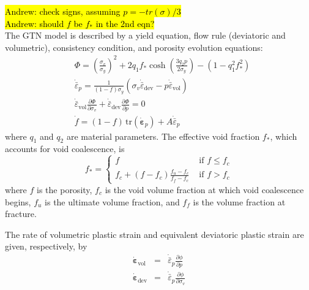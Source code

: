 \documentclass[sn-mathphys,Numbered,draft]{sn-jnl}%
\begin{document}
\hl{Andrew: check signs, assuming $p = -tr(\sigma)/3$}\\
\hl{Andrew: should $f$ be $f_*$ in the 2nd eqn?}\\
The GTN model is described by a yield equation, flow rule (deviatoric and volumetric), consistency condition, and porosity evolution equations:
\begin{eqnarray}
	&\Phi =
	\left(\frac{\sigma_v}{\sigma_y}\right)^2 + 2 q_1 f_* \cosh \left(\frac{3 q_2 p}{2 \sigma_y}\right)
	- \left(1-q_1^2 f^{2}_* \right) \label{eqn:GTN1} \\
	&\dot{\bar{\varepsilon}}_p =
		\frac{1}{(1-f) \sigma_y} (\sigma_v \dot{ \bar{\varepsilon}}_\text{dev} - p \dot{ \bar{\varepsilon}}_\text{vol}) \label{eqn:GTN2} \\
	&\dot{\bar{\varepsilon}}_\text{vol} \frac{\partial \Phi}{\partial \sigma_v}
		+ \dot{\bar{\varepsilon}}_\text{dev} \frac{\partial \Phi}{\partial p} = 0 \label{eqn:GTN3} \\
	&\dot{f} = (1-f) \, \text{tr}\left(\dot{\boldsymbol{\varepsilon}}_p\right)+A \dot{\bar{\varepsilon}}_p \label{eqn:GTN4}
\end{eqnarray}
where $q_1$ and $q_2$ are material parameters.
The effective void fraction $f_*$, which accounts for void coalescence, is
\begin{equation} \label{eqn:GTNCoalescence}
	f_*=
	\left\{
	\begin{array}{cc}
		f & \text { if } f \leq f_c \\
		f_c+\left(f-f_c\right) \frac{f_u-f_c}{f_f-f_c} & \text { if } f>f_c
	\end{array}\right.
\end{equation}
where $f$ is the porosity, $f_c$ is the void volume fraction at which void coalescence begins, $f_u$ is the ultimate volume fraction, and $f_f$ is the volume fraction at fracture.

The rate of volumetric plastic strain and equivalent deviatoric plastic strain are given, respectively, by
\begin{eqnarray}
	\dot{ \boldsymbol{\varepsilon}}_\text{vol} &=& \dot{\bar{\varepsilon}}_p \frac{\partial \phi}{\partial p} \\
	\dot{ \boldsymbol{\varepsilon}}_\text{dev} &=& \dot{\bar{\varepsilon}}_p \frac{\partial \phi}{\partial \sigma_v}
\end{eqnarray}
\end{document}
